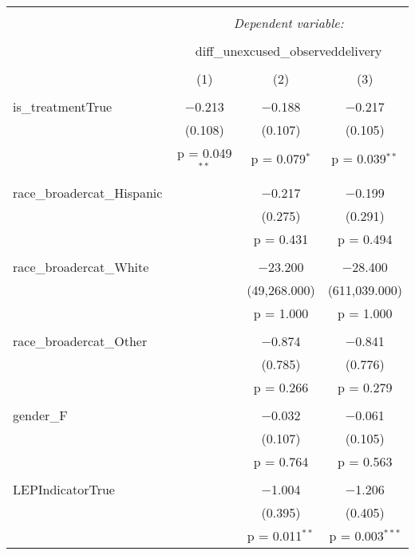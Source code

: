 
\begin{table}[!htbp] \centering 
  \caption{} 
  \label{} 
\begin{tabular}{@{\extracolsep{5pt}}lccc} 
\\[-1.8ex]\hline 
\hline \\[-1.8ex] 
 & \multicolumn{3}{c}{\textit{Dependent variable:}} \\ 
\cline{2-4} 
\\[-1.8ex] & \multicolumn{3}{c}{diff\_unexcused\_observeddelivery} \\ 
\\[-1.8ex] & (1) & (2) & (3)\\ 
\hline \\[-1.8ex] 
 is\_treatmentTrue & $-$0.213 & $-$0.188 & $-$0.217 \\ 
  & (0.108) & (0.107) & (0.105) \\ 
  & p = 0.049$^{**}$ & p = 0.079$^{*}$ & p = 0.039$^{**}$ \\ 
  & & & \\ 
 race\_broadercat\_Hispanic &  & $-$0.217 & $-$0.199 \\ 
  &  & (0.275) & (0.291) \\ 
  &  & p = 0.431 & p = 0.494 \\ 
  & & & \\ 
 race\_broadercat\_White &  & $-$23.200 & $-$28.400 \\ 
  &  & (49,268.000) & (611,039.000) \\ 
  &  & p = 1.000 & p = 1.000 \\ 
  & & & \\ 
 race\_broadercat\_Other &  & $-$0.874 & $-$0.841 \\ 
  &  & (0.785) & (0.776) \\ 
  &  & p = 0.266 & p = 0.279 \\ 
  & & & \\ 
 gender\_F &  & $-$0.032 & $-$0.061 \\ 
  &  & (0.107) & (0.105) \\ 
  &  & p = 0.764 & p = 0.563 \\ 
  & & & \\ 
 LEPIndicatorTrue &  & $-$1.004 & $-$1.206 \\ 
  &  & (0.395) & (0.405) \\ 
  &  & p = 0.011$^{**}$ & p = 0.003$^{***}$ \\ 

\end{tabular}
\end{table}
